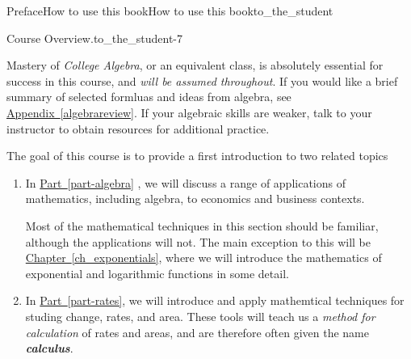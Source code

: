 \documentclass[oneside,10pt,]{tufte-book}
\newcommand{\xreffont}{\relax}
\newcommand{\alert}[1]{\textbf{\textit{#1}}}
\numberwithin{equation}{chapter}
\begin{document}
\begin{preface}{Preface}{How to use this book}{}{How to use this book}{}{}{to_the_student}
\begin{paragraphs}{Course Overview.}{to_the_student-7}
\par
Mastery of \emph{College Algebra}, or an equivalent class, is absolutely essential for success in this course, and \emph{will be assumed throughout}. If you would like a brief summary of selected formluas and ideas from algebra, see \hyperref[algebrareview]{Appendix~{\xreffont\ref{algebrareview}}}. If your algebraic skills are weaker, talk to your instructor to obtain resources for additional practice.%
\par
The goal of this course is to provide a first introduction to two related topics%
\begin{enumerate}
\item{}In \hyperref[part-algebra]{Part~{\xreffont\ref{part-algebra}}} , we will discuss a range of applications of mathematics, including algebra, to economics and business contexts.%
\par
Most of the mathematical techniques in this section should be familiar, although the applications will not. The main exception to this will be \hyperref[ch_exponentials]{Chapter~{\xreffont\ref{ch_exponentials}}\textendash{}{\xreffont\ref{ch_logarithms}}}, where we will introduce the mathematics of exponential and logarithmic functions in some detail.%
\item{}In \hyperref[part-rates]{Part~{\xreffont\ref{part-rates}}\textendash{}{\xreffont\ref{part-integrals}}}, we will introduce and apply mathemtical techniques for studing change, rates, and area. These tools will teach us a \emph{method for calculation} of rates and areas, and are therefore often given the name \alert{calculus}.%
\end{enumerate}
%
\end{paragraphs}%
\end{preface}
%
%
\typeout{************************************************}
\typeout{************************************************}
%
\end{document}
